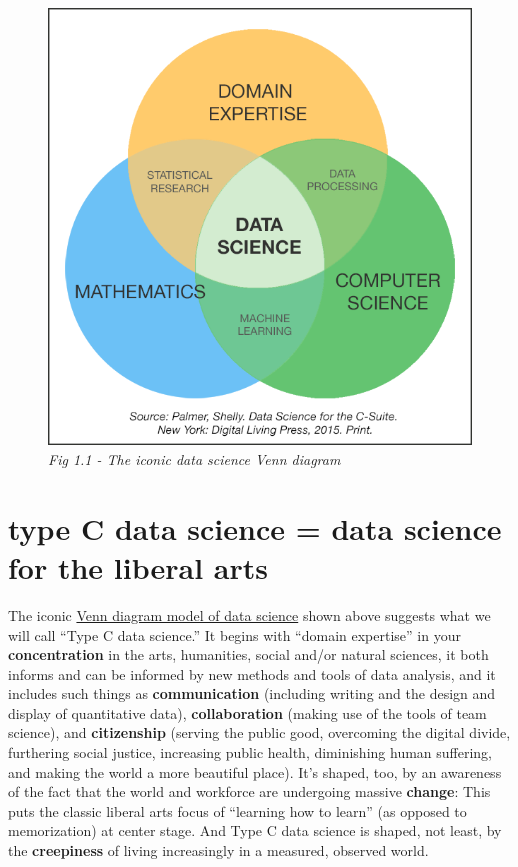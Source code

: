 \documentclass[
  openany]{book}
\begin{document}
\begin{figure}
\centering
\includegraphics{dataVenn.png}
\caption{\emph{Fig 1.1 - The iconic data science Venn diagram}}
\end{figure}

\hypertarget{type-c-data-science-data-science-for-the-liberal-arts}{%
\section{type C data science = data science for the liberal arts}\label{type-c-data-science-data-science-for-the-liberal-arts}}

The iconic \href{https://www.google.com/search?q=venn+diagram+model+of+data+science\&newwindow=1\&safe=active\&rlz=1C1CHBF_enUS762US763\&tbm=isch\&tbo=u\&source=univ\&sa=X\&ved=0ahUKEwiM_abBtY7XAhXDQCYKHdgyB58QsAQIOg\&biw=1378}{Venn diagram model of data science} shown above suggests what we will call ``Type C data science.'' It begins with ``domain expertise'' in your \textbf{concentration} in the arts, humanities, social and/or natural sciences, it both informs and can be informed by new methods and tools of data analysis, and it includes such things as \textbf{communication} (including writing and the design and display of quantitative data), \textbf{collaboration} (making use of the tools of team science), and \textbf{citizenship} (serving the public good, overcoming the digital divide, furthering social justice, increasing public health, diminishing human suffering, and making the world a more beautiful place). It's shaped, too, by an awareness of the fact that the world and workforce are undergoing massive \textbf{change}: This puts the classic liberal arts focus of ``learning how to learn'' (as opposed to memorization) at center stage. And Type C data science is shaped, not least, by the \textbf{creepiness} of living increasingly in a measured, observed world.
\end{document}
